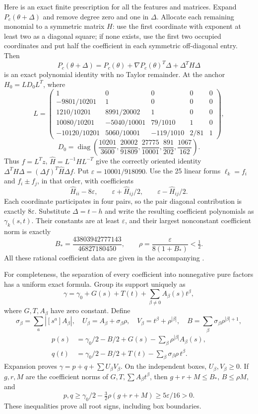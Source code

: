 \documentclass[11pt]{article}
\begin{document}
Here is an exact finite prescription for all the features and matrices.
Expand $P_c(\theta+\Delta)$ and remove degree zero and one in
$\Delta$. Allocate each remaining monomial to a symmetric matrix $H$:
use the first coordinate with exponent at least two as a diagonal
square; if none exists, use the first two occupied coordinates and
put half the coefficient in each symmetric off-diagonal entry. Then
\[
 P_c(\theta+\Delta)=P_c(\theta)+\nabla P_c(\theta)^T\Delta+
                                      \Delta^TH\Delta
\]
is an exact polynomial identity with no Taylor remainder. At the anchor
$H_0=LD_0L^T$, where
\[
 L=\begin{pmatrix}
 1&0&0&0&0\\
 -9801/10201&1&0&0&0\\
 1210/10201&8991/20002&1&0&0\\
 10080/10201&-5040/10001&79/1010&1&0\\
 -10120/10201&5060/10001&-119/1010&2/81&1
 \end{pmatrix},
\]
\[
 D_0=\operatorname{diag}\left(\frac{10201}{3600},
 \frac{20002}{91809},\frac{27775}{10001},\frac{891}{202},\frac{1067}{162}\right).
\]
Thus $f=L^Tz$, $\widehat H=L^{-1}HL^{-T}$ give the correctly oriented
identity $\Delta^TH\Delta=(\Delta f)^T\widehat H\Delta f$.
Put $\varepsilon=10001/918090$. Use the 25 linear forms
$\ell_k=f_i$ and $f_i\pm f_j$, in that order, with coefficients
\[
 \widehat H_{ii}-8\varepsilon,\qquad
 \varepsilon+\widehat H_{ij}/2,\qquad
 \varepsilon-\widehat H_{ij}/2.
\]
Each coordinate participates in four pairs, so the pair diagonal
contribution is exactly $8\varepsilon$. Substitute $\Delta=t-h$ and
write the resulting coefficient polynomials as $\gamma_k(s,t)$.
Their constants are at least $\varepsilon$, and their largest
nonconstant coefficient norm is exactly
\[
 B_*=\frac{43803942777143}{46827180450},\qquad
 \rho=\frac{\varepsilon}{8(1+B_*)}<\tfrac12.
\]
All these rational coefficient data are given in the accompanying
.

For completeness, the separation of every coefficient into nonnegative
pure factors has a uniform exact formula. Group its support uniquely as
\[
 \gamma=\gamma_0+G(s)+T(t)+\sum_{\beta\ne0}A_\beta(s)t^\beta,
\]
where $G,T,A_\beta$ have zero constant. Define
\[
 \sigma_\beta=\sum_a|[s^a]A_\beta|,\quad
 U_\beta=A_\beta+\sigma_\beta\rho,\quad
 V_\beta=t^\beta+\rho^{|\beta|},\quad
 B=\sum_\beta\sigma_\beta\rho^{|\beta|+1},
\]
\[
 \begin{aligned}
 p(s)&=\gamma_0/2-B/2+G(s)-\sum_\beta\rho^{|\beta|}A_\beta(s),\\
 q(t)&=\gamma_0/2-B/2+T(t)-\sum_\beta\sigma_\beta\rho\,t^\beta.
 \end{aligned}
\]
Expansion proves $\gamma=p+q+\sum U_\beta V_\beta$.
On the independent boxes, $U_\beta,V_\beta\geq0$. If $g,r,M$ are
the coefficient norms of $G,T,\sum A_\beta t^\beta$, then
$g+r+M\leq B_*$, $B\leq\rho M$, and
\[
 p,q\geq\gamma_0/2-\tfrac32\rho(g+r+M)
       \geq5\varepsilon/16>0.
\]
These inequalities prove all root signs, including box boundaries.
\end{document}
